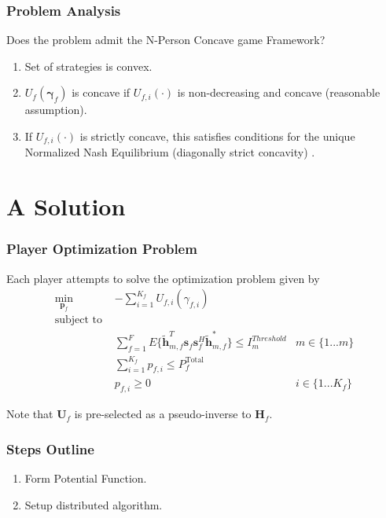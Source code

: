 \documentclass[10pt,tgadventor, onlymath]{beamer}
\begin{document}
\begin{frame}
\frametitle{Problem Analysis}
Does the problem admit the N-Person Concave game Framework? 
\\
\begin{enumerate}
\setlength\itemsep{2em}
\item  Set of strategies is convex. \faThumbsOUp
\item  $U_{f}(\boldsymbol{\gamma}_{f})$ is concave if 
	$U_{f,i}(\cdot)$ is non-decreasing and concave (reasonable assumption). \faThumbsOUp
\item 
	If $U_{f,i}(\cdot)$ is strictly concave, this satisfies conditions for the unique Normalized Nash Equilibrium (diagonally strict concavity) . \faThumbsOUp
\end{enumerate}

\end{frame}



\section{A Solution}
\begin{frame}
\frametitle{Player Optimization Problem}
Each player attempts to solve the optimization problem given by 
	\begin{subequations}
	\begin{align}
	    \underset{\mathbf{p}_{f} }{\text{min}} \;
	    & - \sum_{i=1}^{K_f}
    	U_{f,i}(\gamma_{f,i}) \label{player_opt_c} \\
	    \text{subject to  }\\
	  &
	  \sum^F_{f=1} E\{ \mathbf{\tilde{h}}_{m,f}^T  \mathbf{s}_{f} 						
	\mathbf{s}_{f}^{H} \mathbf{\tilde{h}}_{m,f}^* \}
	\leq I^{Threshold}		
	_{m} & m \in \{1 ...m\} 
		\label{interference_const_c}\\
        & 
        	\sum_{i=1}^{K_{f}} p_{f,i}
	   \leq P_{f}^{\text{Total}}  \label{power_const_c}\\
        & p_{f,i} \geq 0 &  i\in \{1 ...K_{f}\} \label{pos_power_const_c}
	\end{align}
	\end{subequations}

Note that $\mathbf{U}_{f}$ is pre-selected as a pseudo-inverse to  $\mathbf{H}_f$.
\end{frame}


\begin{frame}
\frametitle{Steps Outline}
\begin{enumerate}
\setlength\itemsep{2em}

\item
	Form Potential Function.
\item
	Setup distributed algorithm.
\end{enumerate}
\end{frame}
\end{document}
